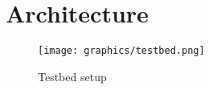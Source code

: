 \chapter{Architecture}


\begin{figure}[ht!]
\centering
\texttt{[image: graphics/testbed.png]}
\caption{Testbed setup}
\label{fig:testbed}
\end{figure}    



